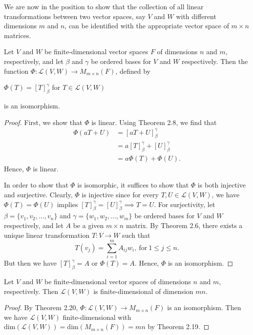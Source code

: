 We are now in the position to show that the collection of all linear transformations between two vector spaces, say \( V  \) and \( W  \) with different dimensions \( m  \) and \( n \), can be identified with the appropriate vector space of \( m \times n  \) matrices.

\begin{theorem}
    Let \( V  \) and \( W  \) be finite-dimensional vector spaces \( F  \) of dimensions \( n  \) and \( m  \), respectively, and let \( \beta  \) and \( \gamma  \) be ordered bases for \( V  \) and \( W  \) respectively. Then the function \( \Phi: \mathcal{L}(V,W) \to {M}_{m \times n}(F)   \), defined by  
    \begin{center}
        \( \Phi(T) = [T]_{\beta}^{\gamma}  \) for \( T \in \mathcal{L}(V,W) \)
    \end{center}
    is an isomorphism.
\end{theorem}
\begin{proof}
First, we show that \( \Phi  \) is linear. Using Theorem 2.8, we find that 
\begin{align*}
    \Phi (aT+U) &= [aT + U]_{\beta}^{\gamma}  \\
                &= a [T]_{\beta}^{\gamma}  + [U]_{\beta}^{\gamma} \\
                &= a \Phi(T) + \Phi(U).
\end{align*}
Hence, \( \Phi  \) is linear.

In order to show that \( \Phi  \) is isomorphic, it suffices to show that \( \Phi  \) is both injective and surjective. Clearly, \( \Phi  \) is injective since for every \( T,U \in \mathcal{L}(V,W) \), we have \( \Phi(T) = \Phi(U)  \) implies \( [T]_{\beta}^{\gamma}  = [U]_{\beta}^{\gamma} \implies T = U   \). For surjectivity, let \( \beta = \{ {v}_{1}, {v}_{2}, \dots, {v}_{n} \}  \) and \( \gamma = \{ {w}_{1}, {w}_{2}, \dots, {w}_{m} \}  \) be ordered bases for \( V  \) and \( W \) respectively, and let \( A  \) be a given \( m \times n  \) matrix. By Theorem 2.6, there exists a unique linear transformation \( T: V \to W  \) such that 
\[  T({v}_{j}) = \sum_{ i=1 }^{ m  }A_{ij} {w}_{i}, \ \text{for} \ 1 \leq j \leq n. \]
But then we have  \( [T]_{\beta}^{\gamma} = A  \) or \( \Phi(T) = A  \). Hence, \( \Phi  \) is an isomorphism. 
\end{proof}

\begin{corollary}
    Let \( V  \) and \( W  \) be finite-dimensional vector spaces of dimensions \( n  \) and \( m  \), respectively. Then \( \mathcal{L}(V,W) \) is finite-dimensional of dimension \( mn  \).
\end{corollary} 
\begin{proof}
    By Theorem 2.20, \( \Phi: \mathcal{L}(V,W) \to {M}_{m \times n}(F) \) is an isomorphism. Then we have \( \mathcal{L}(V,W) \) finite-dimensional with  \( \text{dim}(\mathcal{L}(V,W)) = \text{dim}({M}_{m \times n }(F)) = mn  \) by Theorem 2.19.
\end{proof}

